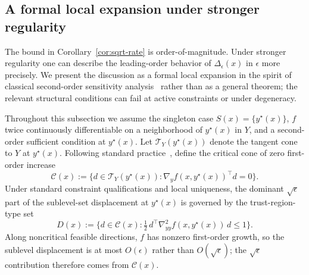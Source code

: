 \documentclass[11pt]{article}
\theoremstyle{definition}
\newcommand{\eps}{\epsilon}
\begin{document}
\subsection{A formal local expansion under stronger regularity}
\label{sec:formal-expansion}
The bound in Corollary~\ref{cor:sqrt-rate} is order-of-magnitude.
Under stronger regularity one can describe the leading-order
behavior of $\Delta_\eps(x)$ in $\eps$ more precisely. We present
the discussion as a formal local expansion in the spirit of
classical second-order sensitivity
analysis~\cite{bonnans2013perturbation,shapiro1988sensitivity,fiacco1983introduction} rather than as a general theorem; the
relevant structural conditions can fail at active constraints
or under degeneracy.

Throughout this subsection we assume the singleton case
$S(x)=\{y^\star(x)\}$, $f$ twice continuously differentiable on a
neighborhood of $y^\star(x)$ in $Y$, and a second-order sufficient
condition at $y^\star(x)$. Let $\mathcal T_Y(y^\star(x))$ denote
the tangent cone to $Y$ at $y^\star(x)$. Following standard
practice~\cite{bonnans2013perturbation}, define the critical cone of zero
first-order increase
\begin{equation}\label{eq:crit-cone}
  \mathcal C(x)
  :=\{d\in\mathcal T_Y(y^\star(x)):
    \nabla_y f(x,y^\star(x))^\top d=0\}.
\end{equation}
Under standard constraint qualifications and local uniqueness, the
dominant $\sqrt\eps$ part of the sublevel-set displacement at
$y^\star(x)$ is governed by the trust-region-type set
\begin{equation}\label{eq:Dx}
  D(x)
  :=\bigl\{d\in\mathcal C(x):
    \tfrac12\,d^\top\nabla_{yy}^2 f(x,y^\star(x))\,d\le 1\bigr\}.
\end{equation}
Along noncritical feasible directions, $f$ has nonzero first-order
growth, so the sublevel displacement is at most $O(\eps)$ rather
than $O(\sqrt\eps)$; the $\sqrt\eps$ contribution therefore comes
from $\mathcal C(x)$.
\end{document}
